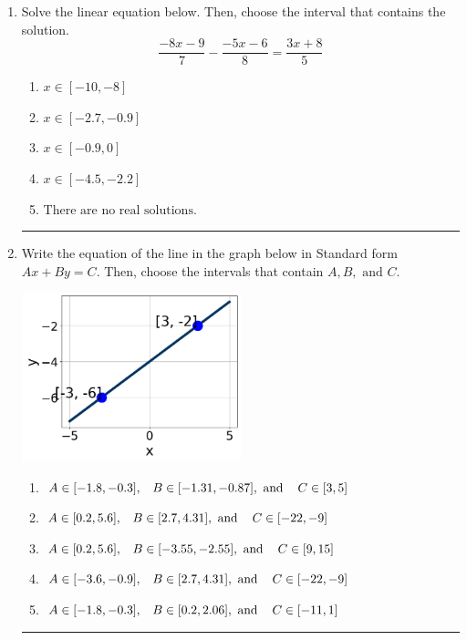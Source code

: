 \documentclass[14pt]{extbook}
\newcommand{\litem}[1]{\item#1\hspace*{-1cm}\rule{\textwidth}{0.4pt}}
\begin{document}
\begin{enumerate}
{\begin{enumerate}[label=\Alph*.]
\end{enumerate} }
\litem{
Solve the linear equation below. Then, choose the interval that contains the solution.\[ \frac{-8x -9}{7} - \frac{-5x -6}{8} = \frac{3x + 8}{5} \]\begin{enumerate}[label=\Alph*.]
\item \( x \in [-10, -8] \)
\item \( x \in [-2.7, -0.9] \)
\item \( x \in [-0.9, 0] \)
\item \( x \in [-4.5, -2.2] \)
\item \( \text{There are no real solutions.} \)

\end{enumerate} }
\litem{
Write the equation of the line in the graph below in Standard form $Ax+By=C$. Then, choose the intervals that contain $A, B, \text{ and } C$.
\begin{center}
    \includegraphics[width=0.5\textwidth]{../Figures/linearGraphToStandardCopyB.png}
\end{center}
\begin{enumerate}[label=\Alph*.]
\item \( A \in [-1.8, -0.3], \hspace{3mm} B \in [-1.31, -0.87], \text{ and } \hspace{3mm} C \in [3, 5] \)
\item \( A \in [0.2, 5.6], \hspace{3mm} B \in [2.7, 4.31], \text{ and } \hspace{3mm} C \in [-22, -9] \)
\item \( A \in [0.2, 5.6], \hspace{3mm} B \in [-3.55, -2.55], \text{ and } \hspace{3mm} C \in [9, 15] \)
\item \( A \in [-3.6, -0.9], \hspace{3mm} B \in [2.7, 4.31], \text{ and } \hspace{3mm} C \in [-22, -9] \)
\item \( A \in [-1.8, -0.3], \hspace{3mm} B \in [0.2, 2.06], \text{ and } \hspace{3mm} C \in [-11, 1] \)

\end{enumerate} }
\end{enumerate}
\end{document}

